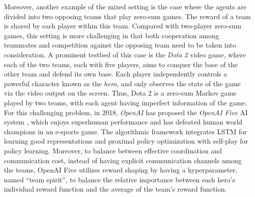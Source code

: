  
Moreover, another example of the mixed setting is the case where the agents are divided into two opposing teams that play zero-sum games. The reward of a team is shared by each player within this team. Compared with two-player zero-sum games, this setting is more challenging in that both cooperation among teammates and competition against the opposing team  need to be taken into consideration. A   prominent testbed of this case is the \emph{Dota 2} video game, where  each of the two teams, each with five players, aims to conquer the base of the other team and defend its own base. Each player independently controls a powerful character known as the \emph{hero}, and only observes the state of the game via the video output on the screen. Thus, Dota 2 is a zero-sum Markov game  played by two teams, with each agent having imperfect information of the game. For this challenging problem, in 2018, \emph{OpenAI} has proposed the \emph{OpenAI Five} AI system \cite{OpenAI_dota}, which enjoys  superhuman performance and has  defeated human world champions in an e-sports game. The algorithmic framework integrates LSTM for learning good representations and proximal policy optimization \cite{schulman2017proximal} with self-play for policy learning. Moreover, to balance between effective coordination and communication cost, instead of having 
explicit communication channels among the teams, OpenAI Five utilizes reward shaping by having a hyperparameter, named ``team spirit'', to balance the relative importance between each hero's individual reward function  and the average of the team's reward function.   


%

